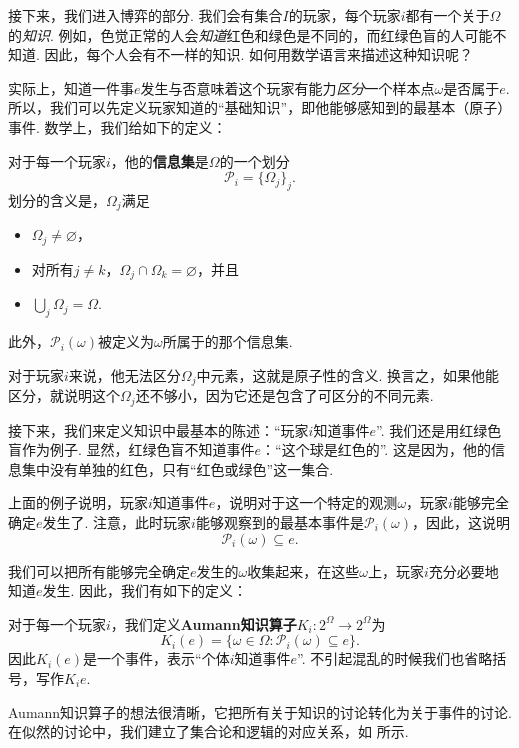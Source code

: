 接下来，我们进入博弈的部分. 我们会有集合$I$的玩家，每个玩家$i$都有一个关于$\Omega$的\textit{知识}. 例如，色觉正常的人会\textit{知道}红色和绿色是不同的，而红绿色盲的人可能不知道. 因此，每个人会有不一样的知识. 如何用数学语言来描述这种知识呢？

实际上，知道一件事$e$发生与否意味着这个玩家有能力\textit{区分}一个样本点$\omega$是否属于$e$. 所以，我们可以先定义玩家知道的“基础知识”，即他能够感知到的最基本（原子）事件. 数学上，我们给如下的定义：

\begin{definition}[信息集]
    对于每一个玩家$i$，他的\textbf{信息集}是$\Omega$的一个划分
    \[\mathcal P_i = \{\Omega_j\}_j.\]
    划分的含义是，$\Omega_j$满足
    \begin{itemize}
        \item $\Omega_j\neq \varnothing$，
        \item 对所有$j\neq k$，$\Omega_j\cap\Omega_k=\varnothing$，并且
        \item $\bigcup_j\Omega_j=\Omega$.
    \end{itemize}
    此外，$\mathcal P_i(\omega)$被定义为$\omega$所属于的那个信息集.
\end{definition}

对于玩家$i$来说，他无法区分$\Omega_j$中元素，这就是原子性的含义. 换言之，如果他能区分，就说明这个$\Omega_j$还不够小，因为它还是包含了可区分的不同元素. 

接下来，我们来定义知识中最基本的陈述：“玩家$i$知道事件$e$”. 我们还是用红绿色盲作为例子. 显然，红绿色盲不知道事件$e$：“这个球是红色的”. 这是因为，他的信息集中没有单独的红色，只有“红色或绿色”这一集合. 

上面的例子说明，玩家$i$知道事件$e$，说明对于这一个特定的观测$\omega$，玩家$i$能够完全确定$e$发生了. 注意，此时玩家$i$能够观察到的最基本事件是$\mathcal P_i(\omega)$，因此，这说明
\[\mathcal P_i(\omega)\subseteq e.\]

我们可以把所有能够完全确定$e$发生的$\omega$收集起来，在这些$\omega$上，玩家$i$充分必要地知道$e$发生. 因此，我们有如下的定义：

\begin{definition}[Aumann知识算子]
    对于每一个玩家$i$，我们定义\textbf{Aumann知识算子}$K_i:2^\Omega\to 2^\Omega$为
    \[K_i(e)=\{\omega\in\Omega:\mathcal P_i(\omega)\subseteq e\}.\]
    因此$K_i(e)$是一个事件，表示“个体$i$知道事件$e$”. 不引起混乱的时候我们也省略括号，写作$K_ie$.
\end{definition}

Aumann知识算子的想法很清晰，它把所有关于知识的讨论转化为关于事件的讨论. 在似然的讨论中，我们建立了集合论和逻辑的对应关系，如 所示.

